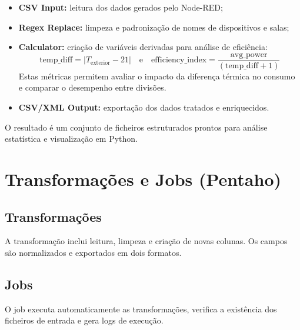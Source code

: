 \documentclass[a4paper, 12pt]{article} %
\begin{document}
\begin{itemize}
	\item \textbf{CSV Input:} leitura dos dados gerados pelo Node-RED;
	\item \textbf{Regex Replace:} limpeza e padronização de nomes de dispositivos e salas;
	\item \textbf{Calculator:} criação de variáveis derivadas para análise de eficiência:
	\[
	\text{temp\_diff} = |T_{\text{exterior}} - 21|
	\quad\text{e}\quad
	\text{efficiency\_index} = \frac{\text{avg\_power}}{(\text{temp\_diff} + 1)}
	\]
	Estas métricas permitem avaliar o impacto da diferença térmica no consumo e comparar o desempenho entre divisões.
	\item \textbf{CSV/XML Output:} exportação dos dados tratados e enriquecidos.
\end{itemize}

O resultado é um conjunto de ficheiros estruturados prontos para análise estatística e visualização em Python.



\newpage
\section{Transformações e Jobs (Pentaho)}

\subsection{Transformações}
A transformação inclui leitura, limpeza e criação de novas colunas.  
Os campos são normalizados e exportados em dois formatos.

\subsection{Jobs}
O job executa automaticamente as transformações, verifica a existência dos ficheiros de entrada e gera logs de execução.

\end{document}
